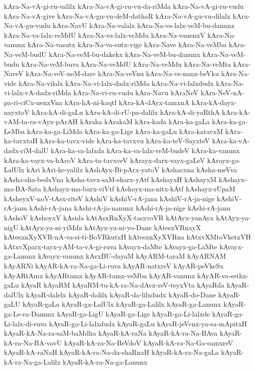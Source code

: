 {kAra-Na-vA-gi-ru-valilx
kAra-Na-vA-gi-ru-vu-da-riMda
kAra-Na-vA-gi-ru-vudu
kAra-Na-vA-give
kAra-Na-vA-gu-vu-deM-dathaR
kAra-Na-vA-gu-vu-dilalx
kAra-Na-vA-gu-vudu
kAra-NavU
kAra-Na-valalx
kAra-Na-va-lalx-veM-bu-danunx
kAra-Na-va-lalx-veMdU
kAra-Na-va-lalx-veMdu
kAra-Na-vanenxV
kAra-Na-vanunx
kAra-Na-vasutx
kAra-Na-va-sutx-vige
kAra-Nave
kAra-Na-veMba
kAra-Na-veM-budU
kAra-Na-veM-bu-dakekx
kAra-Na-veM-bu-danunx
kAra-Na-veM-budu
kAra-Na-veM-buva
kAra-Na-veMdU
kAra-Na-veMdu
kAra-Na-veMta
kAra-NaveV
kAra-Na-veV-neM-dare
kAra-Na-veVnu
kAra-Na-ve-nanx-beVku
kAra-Na-vide
kAra-Na-vilalx
kAra-Na-vi-lalx-dadx-riMda
kAra-Na-vi-lalxdudx
kAra-Na-vi-lalx-vA-dadx-riMda
kAra-Na-vi-ru-vudu
kAra-Navu
kAraNeV
kAra-NeV-nA-pa-ri-ciCx-nenxVna
kAra-hA-ni-kaqtf
kAra-kA-dAyx-tamxnA
kAra-kA-dayx-nayxtoV
kAra-kA-di-gaLu
kAra-kA-di-rU-pa-dalilx
kAra-kA-di-yaRthA
kAra-kA-vAM-ta-ra-vAyx-pArAH
kAraka
kArakaM
kAra-kada
kAra-ka-gaLa
kAra-ka-ga-LeMba
kAra-ka-ga-LiMda
kAra-ka-ga-Lige
kAra-ka-gaLu
kAra-katavxM
kAra-ka-tavxtaH
kAra-ka-tavx-vide
kAra-ka-tavxvu
kAra-ka-teV-SayxteV
kAra-ka-vA-dadx-riM-dalU
kAra-ka-va-lalxda
kAra-ka-va-lalx-veM-budeV
kAra-ka-vanunx
kAra-ka-vayx-va-hAroV
kAra-ta-tavxveV
kArayx-darx-vayx-gaLeV
kArayx-ga-LalUlx
kAri
kAri-ke-yalilx
kAshAyx-Bi-pArx-yatoV
kAshacxna
kAsha-meVva
kAsha-sha-bedxVna
kAsha-tavx-saM-sharx-yAtf
kAshayxH
kAshayxM
kAshayx-ma-BA-Sata
kAshayx-ma-barx-viVtf
kAshayx-ma-nitx-kAtf
kAshayx-rUpaM
kAsheyxV-noV-tAsx-riteV
kAshiV
kAshiV-rA-jana
kAshiV-rA-ja-nige
kAshiV-rA-janu
kAshi-rA-jana
kAshi-rA-ja-nanunx
kAshi-rA-ja-nige
kAshi-rA-janu
kAshoV
kAshoyxV
kAsida
kAtAsxRnXyX-tasxvoVR
kAtAyx-yanAyx
kAtAyx-ya-nigU
kAtAyx-ya-ni-yiMda
kAtAyx-ya-ni-yo-Dane
kAtesxVRnxyX
kAtesxnXyXVR-nA-va-si-ti-BoVRkutxH
kAtesxnXyXVRna
kAtxvXMtoVketxVH
kAtxvXparx-tayx-yAM-ta-vA-gi-ruva
kAvayx-daMte
kAvayx-ga-LaMte
kAvayx-ga-Lanunx
kAvayx-vanunx
kAvxBU-dayaM
kAyARM-taraM
kAyARNAM
kAyARNi
kAyAR-kA-ra-Na-ga-Li-ruva
kAyAR-natxreV
kAyAR-peVkeSx
kAyARtAmx
kAyARtamx
kAyAR-tamx-veMba
kAyAR-vanunx
kAyAR-va-sethx-gaLu
kAyaR
kAyaRM
kAyaRM-tu-kA-ra-Na-dAvx-reV-teyxVta
kAyaRda
kAyaR-dalUlx
kAyaR-dalelx
kAyaR-dalilx
kAyaR-da-lilxdudx
kAyaR-do-Dane
kAyaR-gaLU
kAyaR-gaLa
kAyaR-ga-LalUlx
kAyaR-ga-Lalilx
kAyaR-ga-Lanunx
kAyaR-ga-Le-ra-Danunx
kAyaR-ga-LigU
kAyaR-ga-Lige
kAyaR-ga-Li-lalxde
kAyaR-ga-Li-lalx-di-ruva
kAyaR-ga-Li-lalxdudx
kAyaR-gaLu
kAyaR-jeVcnx-ya-sa-mApitxH
kAyaR-kA-Na-ra-saM-baMdha
kAyaR-kA-raNa
kAyaR-kA-ra-Na-BAva
kAyaR-kA-ra-Na-BA-vavU
kAyaR-kA-ra-Na-BeVdoV
kAyaR-kA-ra-Na-Ga-samxreV
kAyaR-kA-raNaH
kAyaR-kA-ra-Na-da-shaRnaH
kAyaR-kA-ra-Na-gaLa
kAyaR-kA-ra-Na-ga-Lalilx
kAyaR-kA-ra-Na-ga-Lanunx
}
